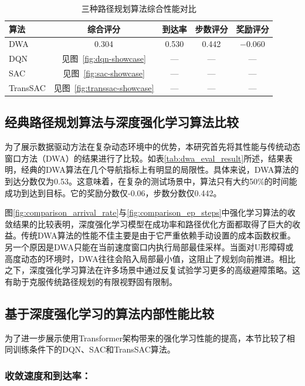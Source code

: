 \begin{table}[H]
    \centering
    \caption{三种路径规划算法综合性能对比}
    \label{tab:algo_comparison}
    \begin{tabular}{lcccc}
        \toprule
        \textbf{算法} & \textbf{综合评分} & \textbf{到达率} & \textbf{步数评分} & \textbf{奖励评分} \\
        \midrule
        DWA      & 0.304 & 0.530 & 0.442 & $-$0.060 \\
        DQN      & 见图~\ref{fig:dqn-showcase}     & —     & —     & — \\
        SAC      & 见图~\ref{fig:sac-showcase}     & —     & —     & — \\
        TransSAC & 见图~\ref{fig:transsac-showcase} & —     & —     & — \\
        \bottomrule
    \end{tabular}
\end{table}

\subsection{经典路径规划算法与深度强化学习算法比较}
为了展示数据驱动方法在复杂动态环境中的优势，本研究首先将其性能与传统动态窗口方法（DWA）的结果进行了比较。如表\ref{tab:dwa_eval_result}所述，结果表明，经典的DWA算法在几个导航指标上有明显的局限性。具体来说，DWA算法的到达分数仅为0.53。这意味着，在复杂的测试场景中，算法只有大约50\%的时间能成功到达到目标。它的奖励分数仅-0.06，步数分数仅0.442。

图\ref{fig:comparison_arrival_rate}与\ref{fig:comparison_ep_steps}中强化学习算法的收敛结果的比较表明，深度强化学习模型在成功率和路径优化方面都取得了巨大的收益。传统DWA算法的性能不佳主要是由于它严重依赖手动设置的成本函数权重。另一个原因是DWA只能在当前速度窗口内执行局部最佳采样。当面对U形障碍或高度动态的环境时，DWA往往会陷入局部最小值，这阻止了规划向前推进。相比之下，深度强化学习算法在许多场景中通过反复试验学习更多的高级避障策略。这有助于克服传统路径规划的有限视野固有限制。

\subsection{基于深度强化学习的算法内部性能比较}
为了进一步展示使用Transformer架构带来的强化学习性能的提高，本节比较了相同训练条件下的DQN、SAC和TransSAC算法。

\subsubsection{收敛速度和到达率：}

